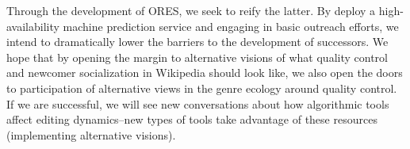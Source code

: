 Through the development of ORES, we seek to reify the latter.  By deploy a high-availability machine prediction service and engaging in basic outreach efforts, we intend to dramatically lower the barriers to the development of successors.  We hope that by opening the margin to alternative visions of what quality control and newcomer socialization in Wikipedia should look like, we also open the doors to participation of alternative views in the genre ecology around quality control.  If we are successful, we will see new conversations about how algorithmic tools affect editing dynamics--new types of tools take advantage of these resources (implementing alternative visions).
